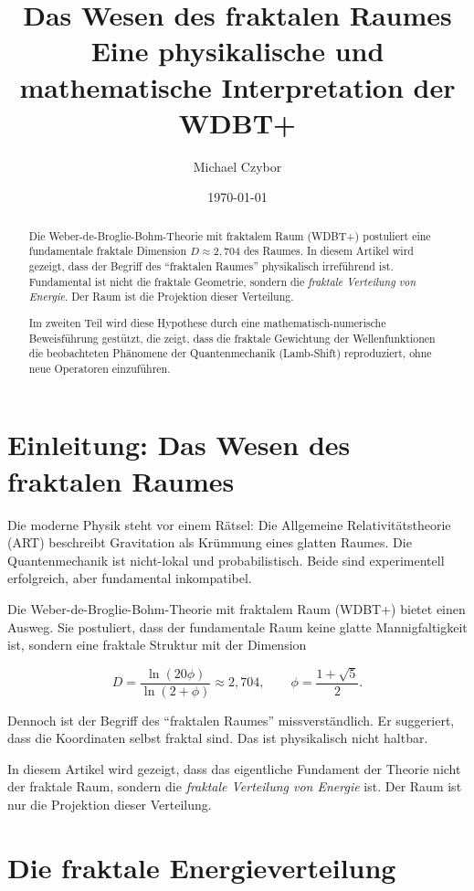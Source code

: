 \documentclass[12pt,a4paper]{article}
\title{Das Wesen des fraktalen Raumes\\ 
Eine physikalische und mathematische Interpretation der WDBT+}
\author{Michael Czybor}
\date{\today}
\begin{document}
\maketitle

\begin{abstract}
Die Weber-de-Broglie-Bohm-Theorie mit fraktalem Raum (WDBT+) postuliert eine fundamentale fraktale Dimension \(D \approx 2,704\) des Raumes. 
In diesem Artikel wird gezeigt, dass der Begriff des ``fraktalen Raumes'' physikalisch irreführend ist. 
Fundamental ist nicht die fraktale Geometrie, sondern die \emph{fraktale Verteilung von Energie}. 
Der Raum ist die Projektion dieser Verteilung. 

Im zweiten Teil wird diese Hypothese durch eine mathematisch-numerische Beweisführung gestützt, die zeigt, dass die fraktale Gewichtung der Wellenfunktionen die beobachteten Phänomene der Quantenmechanik (Lamb-Shift) reproduziert, ohne neue Operatoren einzuführen.
\end{abstract}

\section{Einleitung: Das Wesen des fraktalen Raumes}

Die moderne Physik steht vor einem Rätsel: Die Allgemeine Relativitätstheorie (ART) beschreibt Gravitation als Krümmung eines glatten Raumes. Die Quantenmechanik ist nicht-lokal und probabilistisch. Beide sind experimentell erfolgreich, aber fundamental inkompatibel.

Die Weber-de-Broglie-Bohm-Theorie mit fraktalem Raum (WDBT+) bietet einen Ausweg. Sie postuliert, dass der fundamentale Raum keine glatte Mannigfaltigkeit ist, sondern eine fraktale Struktur mit der Dimension

\begin{equation}
D = \frac{\ln(20\phi)}{\ln(2+\phi)} \approx 2,704, \qquad \phi = \frac{1+\sqrt{5}}{2}.
\end{equation}

Dennoch ist der Begriff des ``fraktalen Raumes'' missverständlich. Er suggeriert, dass die Koordinaten selbst fraktal sind. Das ist physikalisch nicht haltbar.

In diesem Artikel wird gezeigt, dass das eigentliche Fundament der Theorie nicht der fraktale Raum, sondern die \emph{fraktale Verteilung von Energie} ist. Der Raum ist nur die Projektion dieser Verteilung.

\section{Die fraktale Energieverteilung}
\end{document}

